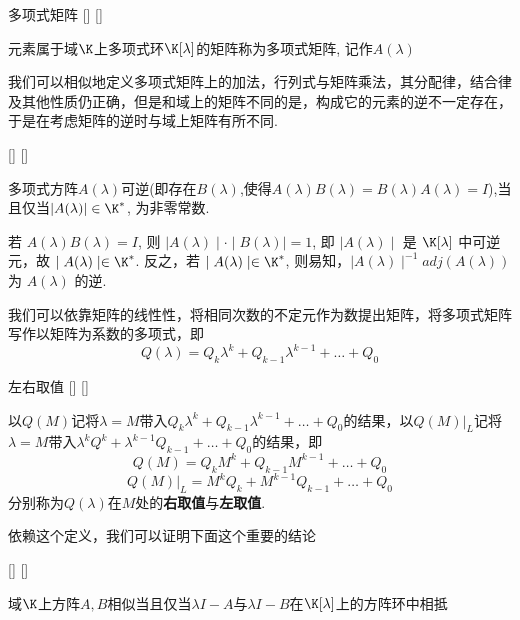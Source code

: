 \documentclass[UTF8]{ctexart}
\begin{document}
        \begin{dfn}
			[]
			{多项式矩阵}
			[]
			[]

        	元素属于域$\K$上多项式环$\K[\lambda]$的矩阵称为多项式矩阵, 记作$A(\lambda)$
        \end{dfn}
        我们可以相似地定义多项式矩阵上的加法，行列式与矩阵乘法，其分配律，结合律及其他性质仍正确，但是和域上的矩阵不同的是，构成它的元素的逆不一定存在，于是在考虑矩阵的逆时与域上矩阵有所不同.
        \begin{thm}
			[]
			{}
			[]
			[]
			
            多项式方阵$A(\lambda)$可逆(即存在$B(\lambda)$,使得$A(\lambda)B(\lambda)=B(\lambda)A(\lambda)=I$),当且仅当$\left|A(\lambda)\right|\in \K^{*}$, 为非零常数.
        \end{thm}
        \begin{prf}
			若 $A(\lambda)B(\lambda)=I$, 则 $\mid A(\lambda)\mid \cdot \mid B(\lambda)\mid=1$, 即 $\mid A(\lambda)\mid$ 是 $\K[\lambda]$ 中可逆元，故 $\mid A(\lambda)\mid \in \K^{*}$. 反之，若 $\mid A(\lambda)\mid \in \K^{*}$, 则易知，$\mid A(\lambda)\mid^{-1}adj(A(\lambda))$ 为 $A(\lambda)$ 的逆.
        \end{prf}
        我们可以依靠矩阵的线性性，将相同次数的不定元作为数提出矩阵，将多项式矩阵写作以矩阵为系数的多项式，即\[Q(\lambda)=Q_k\lambda^k+Q_{k-1}\lambda^{k-1}+…+Q_0\]
        \begin{dfn}
			[]
			{左右取值}
			[]
			[]
			
            以$Q(M)$记将$\lambda=M$带入$Q_k\lambda^k+Q_{k-1}\lambda^{k-1}+…+Q_0$的结果，以$Q(M)|_{L}$记将$\lambda=M$带入$\lambda^kQ^k+\lambda^{k-1}Q_{k-1}+…+Q_0$的结果，即\[Q(M)=Q_kM^k+Q_{k-1}M^{k-1}+…+Q_0\]
            \[Q(M)|_L=M^kQ_k+M^{k-1}Q_{k-1}+…+Q_0
            \]
            分别称为$Q(\lambda)$在$M$处的\textbf{右取值}与\textbf{左取值}.
        \end{dfn}
        依赖这个定义，我们可以证明下面这个重要的结论
        \begin{thm}
			[]
			{}
			[]
			[]
			
            域$\K$上方阵$A,B$相似当且仅当$\lambda I-A$与$\lambda I-B$在$\K[\lambda]$上的方阵环中相抵
		\end{thm}
        \begin{prf}
            
        \end{prf}
\end{document}
